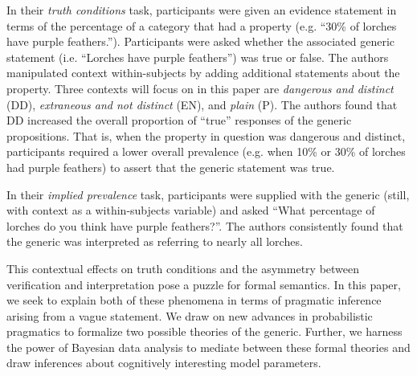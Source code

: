 \documentclass[10pt,letterpaper]{article}
\begin{document}
In their \emph{truth conditions} task, participants were given an evidence statement in terms of the percentage of a category that had a property (e.g. ``30\% of lorches have purple feathers.''). Participants were asked whether the associated generic statement (i.e. ``Lorches have purple feathers'') was true or false. The authors manipulated context within-subjects by adding additional statements about the property. Three contexts will focus on in this paper are \emph{dangerous and distinct} (DD), \emph{extraneous and not distinct} (EN), and \emph{plain} (P). The authors found that DD increased the overall proportion of ``true'' responses of the generic propositions. That is, when the property in question was dangerous and distinct, participants required a lower overall prevalence (e.g. when 10\% or 30\% of lorches had purple feathers) to assert that the generic statement was true.

In their \emph{implied prevalence} task, participants were supplied with the generic (still, with context as a within-subjects variable) and asked ``What percentage of lorches do you think have purple feathers?''. The authors consistently found that the generic was interpreted as referring to nearly all lorches. 

This contextual effects on truth conditions and the asymmetry between verification and interpretation pose a puzzle for formal semantics. In this paper, we seek to explain both of these phenomena in terms of pragmatic inference arising from a vague statement. We draw on new advances in probabilistic pragmatics to formalize two possible theories of the generic. Further, we harness the power of Bayesian data analysis to mediate between these formal theories and draw inferences about cognitively interesting model parameters. 



\end{document}
